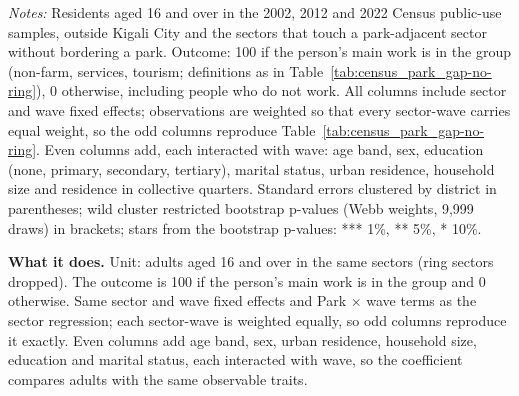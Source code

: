 \documentclass[11pt]{article}
\begin{document}
\begin{table}[H]
\begin{minipage}{0.95\textwidth}
\textit{Notes:} Residents aged 16 and over in the 2002, 2012 and 2022 Census public-use samples, outside Kigali City and the sectors that touch a park-adjacent sector without bordering a park. Outcome: 100 if the person's main work is in the group (non-farm, services, tourism; definitions as in Table~\ref{tab:census_park_gap-no-ring}), 0 otherwise, including people who do not work. All columns include sector and wave fixed effects; observations are weighted so that every sector-wave carries equal weight, so the odd columns reproduce Table~\ref{tab:census_park_gap-no-ring}. Even columns add, each interacted with wave: age band, sex, education (none, primary, secondary, tertiary), marital status, urban residence, household size and residence in collective quarters. Standard errors clustered by district in parentheses; wild cluster restricted bootstrap p-values (Webb weights, 9,999 draws) in brackets; stars from the bootstrap p-values: *** 1\%, ** 5\%, * 10\%.
\end{minipage}
\end{table}

\textbf{What it does.} Unit: adults aged 16 and over in the same sectors (ring sectors dropped). The outcome is 100 if the person's main work is in the group and 0 otherwise. Same sector and wave fixed effects and Park $\times$ wave terms as the sector regression; each sector-wave is weighted equally, so odd columns reproduce it exactly. Even columns add age band, sex, urban residence, household size, education and marital status, each interacted with wave, so the coefficient compares adults with the same observable traits.
\end{document}

